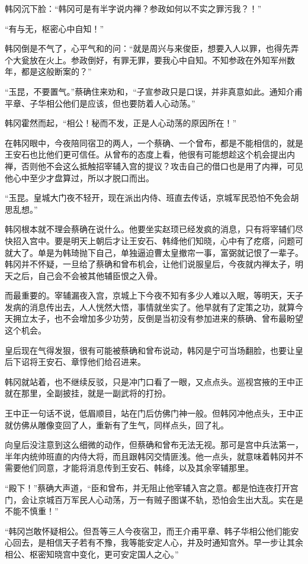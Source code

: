 韩冈沉下脸：“韩冈可是有半字说内禅？参政如何以不实之罪污我？！”

“有与无，枢密心中自知！”

韩冈倒是不气了，心平气和的问：“就是周兴与来俊臣，想要入人以罪，也得先弄个大瓮放在火上。参政倒好，有罪无罪，要我心中自知。不知参政在外知军州数年，都是这般断案的？”

“玉昆，不要置气。”蔡确住来劝和，“子宣参政只是口误，并非真意如此。通知介甫平章、子华相公他们是应该，但也要防着人心动荡。”

韩冈霍然而起，“相公！秘而不发，正是人心动荡的原因所在！”

在韩冈眼中，今夜陪同宿卫的两人，一个蔡确、一个曾布，都是不能相信的，就是王安石也比他们更可信任。从曾布的态度上看，他很有可能想趁这个机会提出内禅，否则他不会这么抵触招宰辅入宫的提议？攻击自己的借口也是用了内禅，可见他心中至少才盘算过，所以才脱口而出。

“玉昆。皇城大门夜不轻开，现在派出内侍、班直去传话，京城军民恐怕不免会胡思乱想。”

韩冈根本就不理会蔡确在说什么。他要坐实赵顼已经发疯的消息，只有将宰辅们尽快招入宫中。要是明天上朝后才让王安石、韩绛他们知晓，心中有了疙瘩，问题可就大了。单是为韩琦抛下自己，单独逼迫曹太皇撤帘一事，富弼就记恨了一辈子。韩冈并不怀疑，一旦给了蔡确和曾布机会，让他们说服皇后，今夜就内禅太子，明天之后，自己会不会被其他辅臣恨之入骨。

而最重要的。宰辅漏夜入宫，京城上下今夜不知有多少人难以入眠，等明天，天子发病的消息传出去，人人恍然大悟，事情就坐实了。他早就有了定策之功，就算今天拥立太子，也不会增加多少功劳，反倒是当初没有参加进来的蔡确、曾布最盼望这个机会。

皇后现在气得发狠，很有可能被蔡确和曾布说动，韩冈是宁可当场翻脸，也要让皇后下诏将王安石、章惇他们给召进来。

韩冈就站着，也不继续反驳，只是冲门口看了一眼，又点点头。巡视宫掖的王中正就在那里，全副披挂，就是一副武将的打扮。

王中正一句话不说，低眉顺目，站在门后仿佛门神一般。但韩冈冲他点头，王中正就仿佛从雕像变回了人，重新有了生气，同样点头，回了礼。

向皇后没注意到这么细微的动作，但蔡确和曾布无法无视。那可是宫中兵法第一，半年内统帅班直的内侍大将，而且跟韩冈交情匪浅。他一点头，就意味着韩冈并不需要他们同意，才能将消息传到王安石、韩绛，以及其余宰辅那里。

“殿下！”蔡确大声道，“臣和曾布，并无阻止他宰辅入宫之意。都是怕连夜打开宫门，会让京城百万军民人心动荡，万一有贼子图谋不轨，恐怕会生出大乱。实在是不能不慎重！”

“韩冈岂敢怀疑相公。但吾等三人今夜宿卫，而王介甫平章、韩子华相公他们能安心回去，是相信天子若有不豫，我等能安定人心，并及时通知宫外。早一步让其余相公、枢密知晓宫中变化，更可安定国人之心。”

